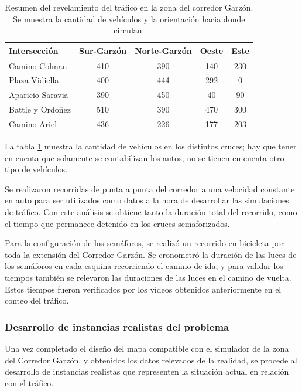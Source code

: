 \begin{table}[H]
	\renewcommand{\arraystretch}{1.2}
	\caption[Resumen del revelamiento del tráfico en la zona del corredor Garzón.]{Resumen del revelamiento del tráfico en la zona del corredor Garzón. Se muestra la cantidad de vehículos y la orientación hacia donde circulan.}
	\label{table:resumen_trafico}
	\centering
	\begin{tabular}{lcccc}
		\hline
		Intersección&
		Sur-Garzón& 
		Norte-Garzón & 
		Oeste &
		Este 
		\\ 
		\hline
		Camino Colman  & 410 & 390 & 140 & 230\\		
		Plaza Vidiella  & 400 & 444 & 292 & 0\\		
		Aparicio Saravia  & 390 & 450 & 40 & 90\\		
		Battle y Ordoñez  & 510 & 390 & 470 & 300 \\	
		Camino Ariel  & 436 & 226 & 177 & 203 \\													
		\hline
		
		
		\hline
	\end{tabular}
\end{table}

La tabla \ref{table:resumen_trafico} muestra la cantidad de vehículos en los distintos cruces; hay que tener en cuenta que solamente se contabilizan los autos, no se tienen en cuenta otro tipo de vehículos.

Se realizaron recorridas de punta a punta del corredor a una velocidad constante en auto para ser utilizados como datos a la hora de desarrollar las simulaciones de tráfico. Con este análisis se obtiene tanto la duración total del recorrido, como el tiempo que permanece detenido en los cruces semaforizados. 

Para la configuración de los semáforos, se realizó un recorrido en bicicleta por toda la extensión del Corredor Garzón. Se cronometró la duración de las luces de los semáforos en cada esquina recorriendo el camino de ida, y para validar los tiempos también se relevaron las duraciones de las luces en el camino de vuelta. Estos tiempos fueron verificados por los vídeos obtenidos anteriormente en el conteo del tráfico.


\subsubsection{Desarrollo de instancias realistas del problema}

Una vez completado el diseño del mapa compatible con el simulador de la zona del Corredor Garzón,  y obtenidos los datos relevados de la realidad, se procede al desarrollo de instancias realistas que representen la situación actual en relación con el tráfico.

